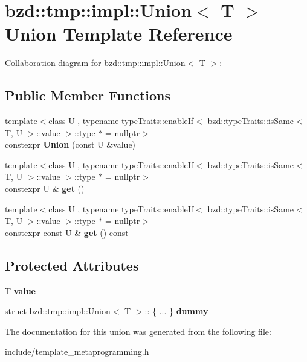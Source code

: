 \hypertarget{unionbzd_1_1tmp_1_1impl_1_1Union_3_01T_01_4}{}\section{bzd\+:\+:tmp\+:\+:impl\+:\+:Union$<$ T $>$ Union Template Reference}
\label{unionbzd_1_1tmp_1_1impl_1_1Union_3_01T_01_4}


Collaboration diagram for bzd\+:\+:tmp\+:\+:impl\+:\+:Union$<$ T $>$\+:
\subsection*{Public Member Functions}
\begin{DoxyCompactItemize}
\item 
\mbox{\label{unionbzd_1_1tmp_1_1impl_1_1Union_3_01T_01_4_a08bb0146a73912d16a76b9c130aa9107}} 
{\footnotesize template$<$class U , typename type\+Traits\+::enable\+If$<$ bzd\+::type\+Traits\+::is\+Same$<$ T, U $>$\+::value $>$\+::type $\ast$  = nullptr$>$ }\\constexpr {\bfseries Union} (const U \&value)
\item 
\mbox{\label{unionbzd_1_1tmp_1_1impl_1_1Union_3_01T_01_4_aa32eae912919f6069821b2c09268714c}} 
{\footnotesize template$<$class U , typename type\+Traits\+::enable\+If$<$ bzd\+::type\+Traits\+::is\+Same$<$ T, U $>$\+::value $>$\+::type $\ast$  = nullptr$>$ }\\constexpr U \& {\bfseries get} ()
\item 
\mbox{\label{unionbzd_1_1tmp_1_1impl_1_1Union_3_01T_01_4_aca89dabe16d7d8105931559b9db99669}} 
{\footnotesize template$<$class U , typename type\+Traits\+::enable\+If$<$ bzd\+::type\+Traits\+::is\+Same$<$ T, U $>$\+::value $>$\+::type $\ast$  = nullptr$>$ }\\constexpr const U \& {\bfseries get} () const
\end{DoxyCompactItemize}
\subsection*{Protected Attributes}
\begin{DoxyCompactItemize}
\item 
\mbox{\label{unionbzd_1_1tmp_1_1impl_1_1Union_3_01T_01_4_af7424741232c13c6c01261fa85696715}} 
T {\bfseries value\+\_\+}
\item 
\mbox{\label{unionbzd_1_1tmp_1_1impl_1_1Union_3_01T_01_4_aaf8974de80d19274b1bd60240f921f24}} 
struct \hyperlink{unionbzd_1_1tmp_1_1impl_1_1Union}{bzd\+::tmp\+::impl\+::\+Union}$<$ T $>$\+:: \{ ... \}  {\bfseries dummy\+\_\+}
\end{DoxyCompactItemize}


The documentation for this union was generated from the following file\+:\begin{DoxyCompactItemize}
\item 
include/template\+\_\+metaprogramming.\+h\end{DoxyCompactItemize}
